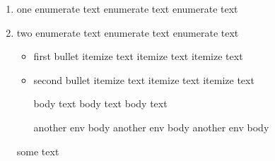 \begin{enumerate}
	\item one
	      enumerate text
	      enumerate text
	      enumerate text
	\item two
	      enumerate text
	      enumerate text
	      enumerate text
	      \begin{itemize}
		      \item first bullet
		            itemize text
		            itemize text
		            itemize text
		      \item second bullet
		            itemize text
		            itemize text
		            itemize text
		            \begin{myenv}
			            body text
			            body text
			            body text
			            \begin{anotherenv}
				            another env body
				            another env body
				            another env body
			            \end{anotherenv}
		            \end{myenv}
	      \end{itemize}
	      some text
\end{enumerate}
